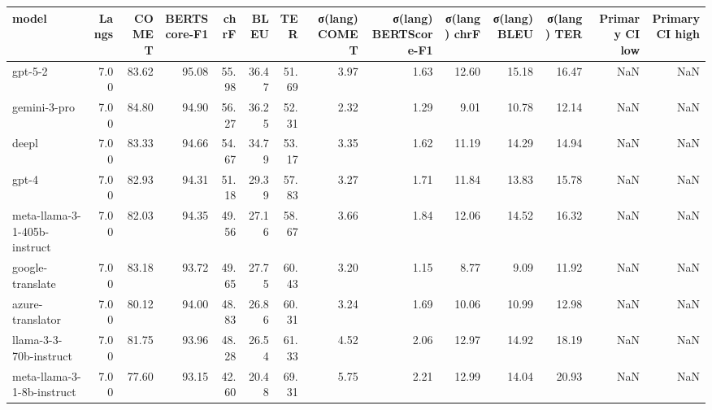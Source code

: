 \begin{tabular}{lrrrrrrrrrrrrr}
\toprule
model & Langs & COMET & BERTScore-F1 & chrF & BLEU & TER & σ(lang) COMET & σ(lang) BERTScore-F1 & σ(lang) chrF & σ(lang) BLEU & σ(lang) TER & Primary CI low & Primary CI high \\
\midrule
gpt-5-2 & 7.00 & 83.62 & 95.08 & 55.98 & 36.47 & 51.69 & 3.97 & 1.63 & 12.60 & 15.18 & 16.47 & NaN & NaN \\
gemini-3-pro & 7.00 & 84.80 & 94.90 & 56.27 & 36.25 & 52.31 & 2.32 & 1.29 & 9.01 & 10.78 & 12.14 & NaN & NaN \\
deepl & 7.00 & 83.33 & 94.66 & 54.67 & 34.79 & 53.17 & 3.35 & 1.62 & 11.19 & 14.29 & 14.94 & NaN & NaN \\
gpt-4 & 7.00 & 82.93 & 94.31 & 51.18 & 29.39 & 57.83 & 3.27 & 1.71 & 11.84 & 13.83 & 15.78 & NaN & NaN \\
meta-llama-3-1-405b-instruct & 7.00 & 82.03 & 94.35 & 49.56 & 27.16 & 58.67 & 3.66 & 1.84 & 12.06 & 14.52 & 16.32 & NaN & NaN \\
google-translate & 7.00 & 83.18 & 93.72 & 49.65 & 27.75 & 60.43 & 3.20 & 1.15 & 8.77 & 9.09 & 11.92 & NaN & NaN \\
azure-translator & 7.00 & 80.12 & 94.00 & 48.83 & 26.86 & 60.31 & 3.24 & 1.69 & 10.06 & 10.99 & 12.98 & NaN & NaN \\
llama-3-3-70b-instruct & 7.00 & 81.75 & 93.96 & 48.28 & 26.54 & 61.33 & 4.52 & 2.06 & 12.97 & 14.92 & 18.19 & NaN & NaN \\
meta-llama-3-1-8b-instruct & 7.00 & 77.60 & 93.15 & 42.60 & 20.48 & 69.31 & 5.75 & 2.21 & 12.99 & 14.04 & 20.93 & NaN & NaN \\
\bottomrule
\end{tabular}
